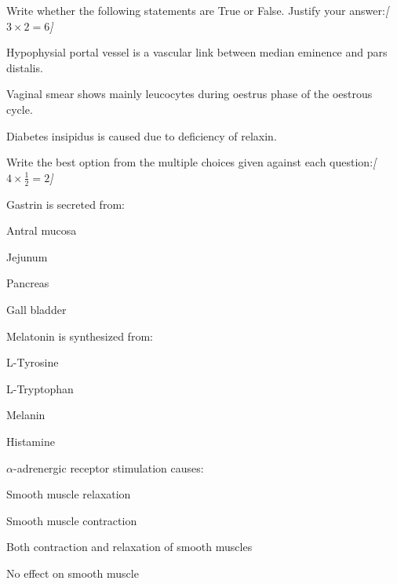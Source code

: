 \documentclass[11pt,a4paper]{article}
\newcommand{\pts}[1]{\hfill   \textit{[#1]}}
\begin{document}
\begin{parts}
  \item Write whether the following statements are True or False. Justify your answer:\pts{$3  \times 2 = 6$}
  
\begin{parts}
    \item Hypophysial portal vessel is a vascular link between median eminence and pars distalis.
    \item Vaginal smear shows mainly leucocytes during oestrus phase of the oestrous cycle.
    \item Diabetes insipidus is caused due to deficiency of relaxin.
  \end{parts}

  \item Write the best option from the multiple choices given against each question:\pts{$4  \times \frac{1}{2} = 2$}
  
\begin{parts}
    \item Gastrin is secreted from:
    
\begin{parts}
      \item Antral mucosa
      \item Jejunum
      \item Pancreas
      \item Gall bladder
    \end{parts}

    \item Melatonin is synthesized from:
    
\begin{parts}
      \item L-Tyrosine
      \item L-Tryptophan
      \item Melanin
      \item Histamine
    \end{parts}

    \item $\alpha$-adrenergic receptor stimulation causes:
    
\begin{parts}
      \item Smooth muscle relaxation
      \item Smooth muscle contraction
      \item Both contraction and relaxation of smooth muscles
      \item No effect on smooth muscle
    \end{parts}


\end{parts}
\end{parts}
\end{document}
